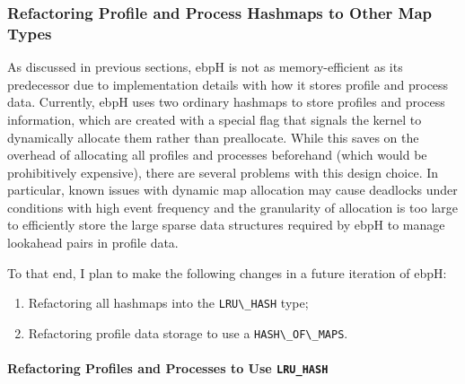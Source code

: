 \documentclass[
  12pt]{findlay}
\newcommand{\passthrough}[1]{#1}
\providecommand{\tightlist}{\setlength{\itemsep}{0pt}\setlength{\parskip}{0pt}}
\begin{document}
\hypertarget{refactoring-profile-and-process-hashmaps-to-other-map-types}{%
\subsubsection{Refactoring Profile and Process Hashmaps to Other Map
Types}\label{refactoring-profile-and-process-hashmaps-to-other-map-types}}

\label{lru_section}

As discussed in previous sections, ebpH is not as memory-efficient as
its predecessor due to implementation details with how it stores profile
and process data. Currently, ebpH uses two ordinary hashmaps to store
profiles and process information, which are created with a special flag
that signals the kernel to dynamically allocate them rather than
preallocate. While this saves on the overhead of allocating all profiles
and processes beforehand (which would be prohibitively expensive), there
are several problems with this design choice. In particular, known
issues with dynamic map allocation may cause deadlocks under conditions
with high event frequency \autocite{starovoitov16prealloc} and the
granularity of allocation is too large to efficiently store the large
sparse data structures required by ebpH to manage lookahead pairs in
profile data.

To that end, I plan to make the following changes in a future iteration
of ebpH:

\begin{enumerate}
\def\labelenumi{\arabic{enumi})}
\tightlist
\item
  Refactoring all hashmaps into the \passthrough{\lstinline!LRU\_HASH!}
  type;
\item
  Refactoring profile data storage to use a
  \passthrough{\lstinline!HASH\_OF\_MAPS!}.
\end{enumerate}

\hypertarget{refactoring-profiles-and-processes-to-use-lru_hash}{%
\paragraph{\texorpdfstring{Refactoring Profiles and Processes to Use
\texttt{LRU\_HASH}}{Refactoring Profiles and Processes to Use LRU\_HASH}}\label{refactoring-profiles-and-processes-to-use-lru_hash}}
\end{document}
